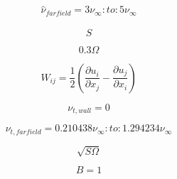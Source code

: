 \begin{equation}
\hat \nu_{farfield} = 3 \nu_{\infty} : to : 5 \nu_{\infty}
\end{equation}

\begin{equation}
\hat S
\end{equation}

\begin{equation}
0.3 \Omega
\end{equation}

\begin{equation}
W_{ij} = \frac{1}{2} \left(\frac{\partial u_i}{\partial x_j} -
   \frac{\partial u_j}{\partial x_i} \right)
\end{equation}

\begin{equation}
\nu_{t,wall} = 0
\end{equation}

\begin{equation}
\nu_{t,farfield} = 0.210438 \nu_{\infty} : to : 1.294234 \nu_{\infty}
\end{equation}

\begin{equation}
\sqrt{S \Omega}
\end{equation}

\begin{equation}
B=1
\end{equation}


